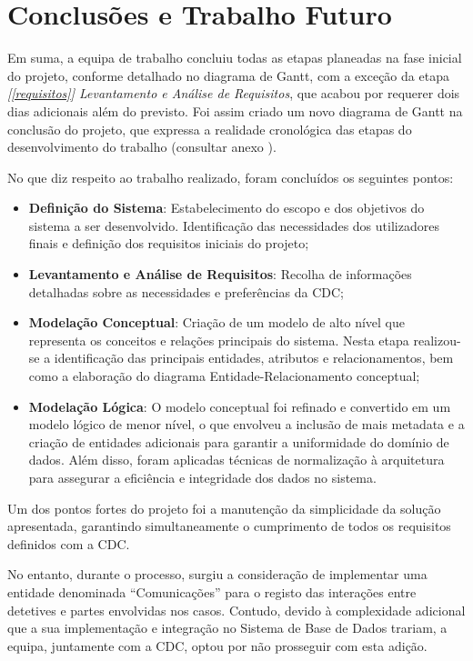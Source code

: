 \documentclass[a4paper,12pt]{scrreprt}
\begin{document}
\chapter{Conclusões e Trabalho Futuro}

    Em suma, a equipa de trabalho concluiu todas as etapas planeadas na fase inicial do projeto, conforme detalhado no diagrama de Gantt, com a exceção da etapa \textit{[\ref{requisitos}] Levantamento e Análise de Requisitos}, que acabou por requerer dois dias adicionais além do previsto. Foi assim criado um novo diagrama de Gantt na conclusão do projeto, que expressa a realidade cronológica das etapas do desenvolvimento do trabalho (consultar anexo \textit{}).

    No que diz respeito ao trabalho realizado, foram concluídos os seguintes pontos:
    \begin{itemize}
        \item \textbf{Definição do Sistema}: Estabelecimento do escopo e dos objetivos do sistema a ser desenvolvido. Identificação das necessidades dos utilizadores finais e definição dos requisitos iniciais do projeto;
        \item \textbf{Levantamento e Análise de Requisitos}: Recolha de informações detalhadas sobre as necessidades e preferências da CDC;
        \item \textbf{Modelação Conceptual}: Criação de um modelo de alto nível que representa os conceitos e relações principais do sistema. Nesta etapa realizou-se a identificação das principais entidades, atributos e relacionamentos, bem como a elaboração do diagrama
        Entidade-Relacionamento conceptual;
        \item \textbf{Modelação Lógica}: O modelo conceptual foi refinado e convertido em um modelo lógico de menor nível, o que envolveu a inclusão de mais metadata e a criação de entidades adicionais para garantir a uniformidade do domínio de dados. Além disso, foram aplicadas técnicas de normalização à arquitetura para assegurar a eficiência e integridade dos dados no sistema.
    \end{itemize}

    Um dos pontos fortes do projeto foi a manutenção da simplicidade da solução apresentada, garantindo simultaneamente o cumprimento de todos os requisitos definidos com a CDC.

    No entanto, durante o processo, surgiu a consideração de implementar uma entidade denominada “Comunicações” para o registo das interações entre detetives e partes envolvidas nos casos. Contudo, devido à complexidade adicional que a sua implementação e integração no Sistema de Base de Dados trariam, a equipa, juntamente com a CDC, optou por não prosseguir com esta adição.
\end{document}
